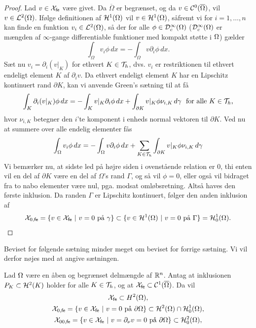 \begin{proof}
Lad $v\in {\mathcal{X}}_{\mathsf{fe}}$ være givet. Da $\overline{\Omega}$ er begrænset, og da 
$v\in {\cal{C}}^0(\overline{\Omega})$, vil $v\in {\mathcal L}^2(\Omega)$. Ifølge 
definitionen af $\mathcal H^1(\Omega)$ vil $v\in \mathcal H^1(\Omega)$, såfremt vi for
$i=1,\ldots,n$ kan finde en funktion $v_i \in {\mathcal L}^2(\Omega)$, så der for alle 
$\phi \in {\cal{D}}^{\infty}_{c}(\Omega)$
(${\cal{D}}^{\infty}_{c}(\Omega)$ er mængden af $\infty$-gange
differentiable funktioner med kompakt støtte i $\Omega$) gælder 
\begin{equation}
  \int_{\Omega} v_i \phi\, dx = - \int_{\Omega} v\partial_i \phi\, dx .
\end{equation}
Sæt nu $v_i = \partial_i(v|_K)$ for ethvert $K\in {\cal{T}}_h$, dvs. $v_i$ er 
restriktionen til ethvert endeligt element $K$ af $\partial_i v$. Da 
ethvert endeligt element $K$ har en Lipschitz kontinuert rand $\partial K$,
kan vi anvende Green's sætning til at få
\begin{equation} 
  \int_K \partial_i(v|_K)\phi\, dx = 
  -\int_K v|_K \partial_i \phi\, dx +
  \int_{\partial K} v|_K \phi \nu_{i,K}\, d\gamma \ \ \text{for alle $K\in {\cal{T}}_h$,} 
\end{equation}
hvor $\nu_{i,K}$ betegner den $i$'te komponent i enheds normal vektoren
til $\partial K$. Ved nu at summere over alle endelig elementer fås
\begin{equation}
   \int_{\Omega} v_i \phi\, dx = 
   -\int_{\Omega} v \partial_i \phi\, dx +
   \sum_{K\in {\cal{T}}_h} \int_{\partial K} v|_K \phi \nu_{i,K}\, d\gamma 
\end{equation}
Vi bemærker nu, at sidste led på højre siden i ovenstående relation er 0, 
thi enten vil en del af $\partial K$ være en del af $\Omega$'s rand 
$\Gamma$, og så vil $\phi=0$, eller også vil bidraget fra to nabo elementer 
være nul, pga. modsat omløbsretning. Altså haves den første inklusion.
Da randen $\Gamma$ er Lipschitz kontinuert, følger den anden inklusion af
\begin{equation} 
   {\mathcal X}_{0,{\mathsf{fe}}} =\{ v \in \Xfe \ |\ v = 0 
   \ \text{på $\gamma$} \} \subset
   \{ v \in \Het \ |\ v = 0 \ \text{på $\Gamma$} \} = \H^1_0(\Omega). 
\end{equation}
\end{proof}

Beviset for følgende sætning minder meget om beviset for forrige sætning. 
Vi vil derfor nøjes med at angive sætningen.
\begin{theorem} \label{xfeh2}
Lad $\Omega$ være en åben og begrænset delmængde af $\mathbb{R}^n$. Antag at
inklusionen $P_K \subset \mathcal H^2(K)$ holder for alle $K\in {\cal{T}}_h$, og at
${\mathcal{X}}_{\mathsf{fe}} \subset {\cal{C}}^1(\overline{\Omega})$. Da vil
\begin{gather}
   {\mathcal{X}}_{\mathsf{fe}} \subset H^2(\Omega), \\
   {\mathcal X}_{0,{\mathsf{fe}}} = \{ v \in {\mathcal{X}}_{\mathsf{fe}}\ |\ v = 0 \
   \text{på $\partial\Omega$} \} 
   \subset \mathcal H^2(\Omega) \cap \mathcal H^1_0(\Omega), \\
   {\mathcal X}_{00,{\mathsf{fe}}}  = \{ v \in {\mathcal{X}}_{\mathsf{fe}} \ |\ v = 
   \partial_{\nu}v = 0 \ \text{på $\partial\Omega$} \} 
   \subset \mathcal H^2_0(\Omega), 
\end{gather}
\end{theorem}

